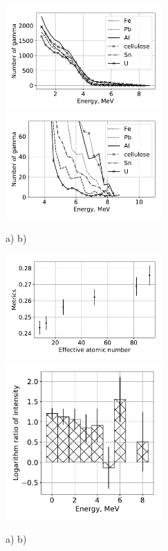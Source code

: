 \documentclass[a4paper]{panl}
\begin{document}
\begin{figure}[t]
    \begin{center}
        \includegraphics[width=60mm]{figures/diffmat0.pdf} 
        \includegraphics[width=60mm]{figures/diffmat.pdf}  
        \vspace{-3mm}
        \caption{a) b)}
    \end{center}
    \vspace{-5mm}
\end{figure}
\begin{figure}[t]
    \begin{center}
        \includegraphics[width=60mm]{figures/diffmat1.pdf} 
        \includegraphics[width=60mm]{figures/Difference.pdf}  
        \vspace{-3mm}
        \caption{a) b)}
    \end{center}
    \vspace{-5mm}
\end{figure}
\end{document}
